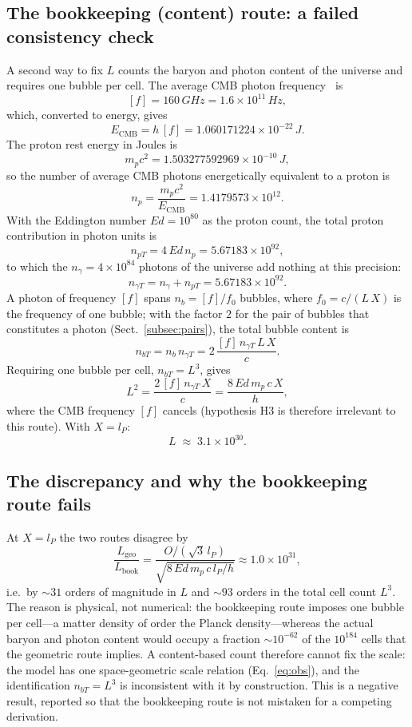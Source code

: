 \documentclass{ijuc}
\begin{document}
\subsection{The bookkeeping (content) route: a failed consistency check}
A second way to fix $L$ counts the baryon and photon content of the universe and requires one bubble per cell.  The average CMB photon frequency~\cite{archeops} is
\[
[f]=160\,GHz=1.6\times10^{11}\,Hz,
\]
which, converted to energy, gives
\[
E_{\mathrm{CMB}}=h\,[f]=1.060171224\times10^{-22}\,J.
\]
The proton rest energy in Joules is
\[
m_{p}c^{2}=1.503277592969\times10^{-10}\,J,
\]
so the number of average CMB photons energetically equivalent to a proton is
\[
n_{p}=\frac{m_{p}c^{2}}{E_{\mathrm{CMB}}}=1.4179573\times10^{12}.
\]
With the Eddington number $Ed=10^{80}$ as the proton count, the total proton contribution in photon units is
\[
n_{pT}=4\,Ed\,n_{p}=5.67183\times10^{92},
\]
to which the $n_{\gamma}=4\times10^{84}$ photons of the universe add nothing at this precision:
\[
n_{\gamma T}=n_{\gamma}+n_{pT}=5.67183\times10^{92}.
\]
A photon of frequency $[f]$ spans $n_{b}=[f]/f_{0}$ bubbles, where $f_{0}=c/(L\,X)$ is the frequency of one bubble; with the factor $2$ for the pair of bubbles that constitutes a photon (Sect.~\ref{subsec:pairs}), the total bubble content is
\[
n_{bT}=n_{b}\,n_{\gamma T}
=2\,\frac{[f]\,n_{\gamma T}\,L\,X}{c}.
\]
Requiring one bubble per cell, $n_{bT}=L^{3}$, gives
\[
L^{2}=\frac{2\,[f]\,n_{\gamma T}\,X}{c}
=\frac{8\,Ed\,m_{p}\,c\,X}{h},
\]
where the CMB frequency $[f]$ cancels (hypothesis H3 is therefore irrelevant to this route).  With $X=l_{P}$:
\[
L \;\approx\; 3.1\times10^{30}.
\]

\subsection{The discrepancy and why the bookkeeping route fails}
At $X=l_{P}$ the two routes disagree by
\[
\frac{L_{\mathrm{geo}}}{L_{\mathrm{book}}}
=\frac{O/(\sqrt{3}\,l_{P})}{\sqrt{8\,Ed\,m_{p}\,c\,l_{P}/h}}
\approx 1.0\times10^{31},
\]
i.e.\ by $\sim31$ orders of magnitude in $L$ and $\sim93$ orders in the total cell count $L^{3}$.  The reason is physical, not numerical: the bookkeeping route imposes one bubble per cell---a matter density of order the Planck density---whereas the actual baryon and photon content would occupy a fraction $\sim10^{-62}$ of the $10^{184}$ cells that the geometric route implies.  A content-based count therefore cannot fix the scale: the model has one space-geometric scale relation (Eq.~\eqref{eq:obs}), and the identification $n_{bT}=L^{3}$ is inconsistent with it by construction.  This is a negative result, reported so that the bookkeeping route is not mistaken for a competing derivation.
\end{document}
